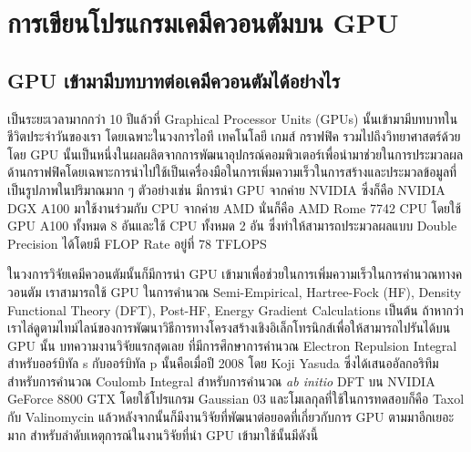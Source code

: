 \section{การเขียนโปรแกรมเคมีควอนตัมบน GPU}

\subsection{GPU เข้ามามีบทบาทต่อเคมีควอนตัมได้อย่างไร}

เป็นระยะเวลามากกว่า 10 ปีแล้วที่ Graphical Processor Units (GPUs) นั้นเข้ามามีบทบาทในชีวิตประจำวันของเรา โดยเฉพาะในวงการไอที
เทคโนโลยี เกมส์ กราฟฟิค รวมไปถึงวิทยาศาสตร์ด้วย โดย GPU นั้นเป็นหนึ่งในผลผลิตจากการพัฒนาอุปกรณ์คอมพิวเตอร์เพื่อนำมาช่วยในการประมวลผล%
ด้านกราฟฟิคโดยเฉพาะการนำไปใช้เป็นเครื่องมือในการเพิ่มความเร็วในการสร้างและประมวลข้อมูลที่เป็นรูปภาพในปริมาณมาก ๆ ตัวอย่างเช่น
มีการนำ GPU จากค่าย NVIDIA ซึ่งก็คือ NVIDIA DGX A100 มาใช้งานร่วมกับ CPU จากค่าย AMD นั่นก็คือ AMD Rome 7742 CPU โดยใช้ GPU
A100 ทั้งหมด 8 อันและใช้ CPU ทั้งหมด 2 อัน ซึ่งทำให้สามารถประมวลผลแบบ Double Precision ได้โดยมี FLOP Rate อยู่ที่ 78 TFLOPS

ในวงการวิจัยเคมีควอนตัมนั้นก็มีการนำ GPU เข้ามาเพื่อช่วยในการเพิ่มความเร็วในการคำนวณทางควอนตัม เราสามารถใช้ GPU ในการคำนวณ
Semi-Empirical, Hartree-Fock (HF), Density Functional Theory (DFT), Post-HF, Energy Gradient Calculations เป็นต้น
ถ้าหากว่าเราไล่ดูตามไทม์ไลน์ของการพัฒนาวิธีการทางโครงสร้างเชิงอิเล็กโทรนิกส์เพื่อให้สามารถไปรันได้บน GPU นั้น บทความงานวิจัยแรกสุดเลย%
ที่มีการศึกษาการคำนวณ Electron Repulsion Integral สำหรับออร์บิทัล s กับออร์บิทัล p นั้นคือเมื่อปี 2008 โดย Koji Yasuda
ซึ่งได้เสนออัลกอริทึมสำหรับการคำนวณ Coulomb Integral สำหรับการคำนวณ \textit{ab initio} DFT บน NVIDIA GeForce 8800 GTX
โดยใช้โปรแกรม Gaussian 03 และโมเลกุลที่ใช้ในการทดสอบก็คือ Taxol กับ Valinomycin\autocite{yasuda2008}
แล้วหลังจากนั้นก็มีงานวิจัยที่พัฒนาต่อยอดที่เกี่ยวกับการ GPU ตามมาอีกเยอะมาก\autocite{qi2023} สำหรับลำดับเหตุการณ์ในงานวิจัยที่นำ GPU
เข้ามาใช้นั้นมีดังนี้


